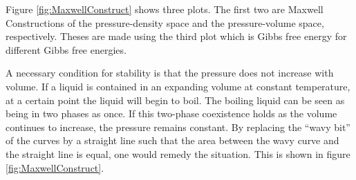 \documentclass{article}
\begin{document}
Figure \ref{fig:MaxwellConstruct} shows three plots. The first two are Maxwell Constructions of the pressure-density space and the pressure-volume space, respectively. Theses are made using the third plot which is Gibbs free energy for different Gibbs free energies. 

A necessary condition for stability is that the pressure does not increase with volume. If a liquid is contained in an expanding volume at constant temperature, at a certain point the liquid will begin to boil. The boiling liquid can be seen as being in two phases as once. If this two-phase coexistence holds as the volume continues to increase, the pressure remains constant. By replacing the ``wavy bit'' of the curves by a straight line such that the area between the wavy curve and the straight line is equal, one would remedy the situation. This is shown in figure \ref{fig:MaxwellConstruct}.
\end{document}
